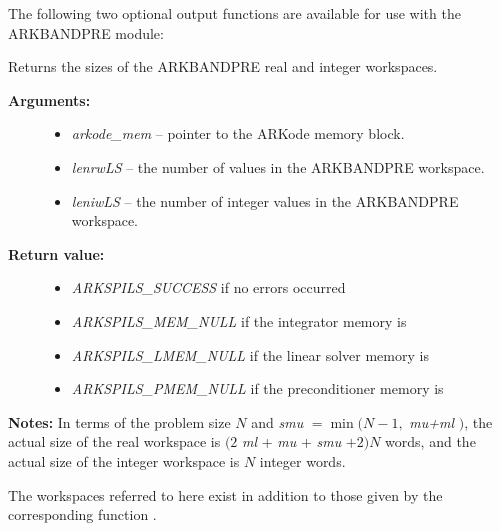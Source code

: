 \documentclass[letterpaper,10pt,english]{sphinxmanual}
\begin{document}
The following two optional output functions are available for use with
the ARKBANDPRE module:

\begin{fulllineitems}
\label{c_interface/Preconditioners:c.ARKBandPrecGetWorkSpace}
Returns the sizes of the ARKBANDPRE real and integer
workspaces.
\begin{description}
\item[{\textbf{Arguments:}}] \leavevmode\begin{itemize}
\item {} 
\emph{arkode\_mem} -- pointer to the ARKode memory block.

\item {} 
\emph{lenrwLS} -- the number of  values in the
ARKBANDPRE workspace.

\item {} 
\emph{leniwLS} -- the number of integer values in the  ARKBANDPRE workspace.

\end{itemize}

\item[{\textbf{Return value:}}] \leavevmode\begin{itemize}
\item {} 
\emph{ARKSPILS\_SUCCESS} if no errors occurred

\item {} 
\emph{ARKSPILS\_MEM\_NULL} if the integrator memory is 

\item {} 
\emph{ARKSPILS\_LMEM\_NULL} if the linear solver memory is 

\item {} 
\emph{ARKSPILS\_PMEM\_NULL} if the preconditioner memory is 

\end{itemize}

\end{description}

\textbf{Notes:} In terms of the problem size \(N\) and \emph{smu} \(=
\min(N-1,\) \emph{mu+ml} \()\), the actual size of the real
workspace is \((2\) \emph{ml} + \emph{mu} + \emph{smu} \(+2)N\) 
words, and the actual size of the integer workspace is \(N\)
integer words.

The workspaces referred to here exist in addition to those given by
the corresponding function .

\end{fulllineitems}
\end{document}
